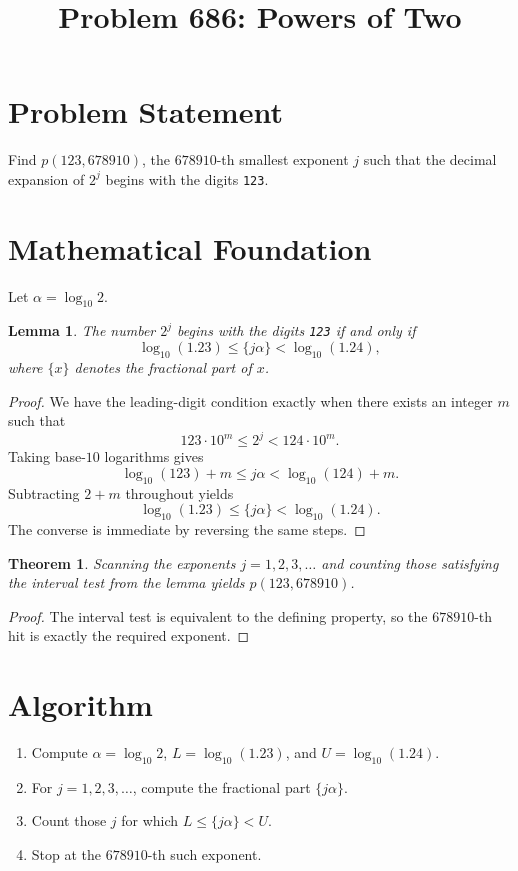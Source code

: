 \documentclass[11pt]{article}
\title{Problem 686: Powers of Two}
\author{}
\date{}
\newtheorem{lemma}{Lemma}
\newtheorem{theorem}{Theorem}
\begin{document}
\maketitle

\section{Problem Statement}

Find $p(123,678910)$, the $678910$-th smallest exponent $j$ such that the decimal expansion of $2^j$ begins with the digits \texttt{123}.

\section{Mathematical Foundation}

Let $\alpha = \log_{10} 2$.

\begin{lemma}
The number $2^j$ begins with the digits \texttt{123} if and only if
\[
  \log_{10}(1.23) \le \{j\alpha\} < \log_{10}(1.24),
\]
where $\{x\}$ denotes the fractional part of $x$.
\end{lemma}

\begin{proof}
We have the leading-digit condition exactly when there exists an integer $m$ such that
\[
  123 \cdot 10^m \le 2^j < 124 \cdot 10^m.
\]
Taking base-$10$ logarithms gives
\[
  \log_{10}(123) + m \le j\alpha < \log_{10}(124) + m.
\]
Subtracting $2+m$ throughout yields
\[
  \log_{10}(1.23) \le \{j\alpha\} < \log_{10}(1.24).
\]
The converse is immediate by reversing the same steps.
\end{proof}

\begin{theorem}
Scanning the exponents $j=1,2,3,\dots$ and counting those satisfying the interval test from the lemma yields $p(123,678910)$.
\end{theorem}

\begin{proof}
The interval test is equivalent to the defining property, so the $678910$-th hit is exactly the required exponent.
\end{proof}

\section{Algorithm}

\begin{enumerate}
  \item Compute $\alpha = \log_{10}2$, $L=\log_{10}(1.23)$, and $U=\log_{10}(1.24)$.
  \item For $j=1,2,3,\dots$, compute the fractional part $\{j\alpha\}$.
  \item Count those $j$ for which $L \le \{j\alpha\} < U$.
  \item Stop at the $678910$-th such exponent.
\end{enumerate}
\end{document}
